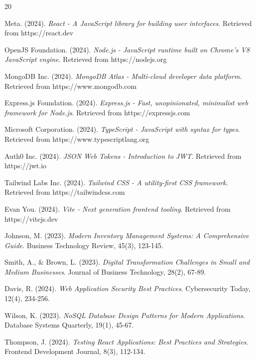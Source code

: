 \renewcommand{\bibname}{REFERENCES}
\begin{thebibliography}{20}

Meta. (2024). \textit{React - A JavaScript library for building user interfaces}. Retrieved from https://react.dev

OpenJS Foundation. (2024). \textit{Node.js - JavaScript runtime built on Chrome's V8 JavaScript engine}. Retrieved from https://nodejs.org

MongoDB Inc. (2024). \textit{MongoDB Atlas - Multi-cloud developer data platform}. Retrieved from https://www.mongodb.com

Express.js Foundation. (2024). \textit{Express.js - Fast, unopinionated, minimalist web framework for Node.js}. Retrieved from https://expressjs.com

Microsoft Corporation. (2024). \textit{TypeScript - JavaScript with syntax for types}. Retrieved from https://www.typescriptlang.org

Auth0 Inc. (2024). \textit{JSON Web Tokens - Introduction to JWT}. Retrieved from https://jwt.io

Tailwind Labs Inc. (2024). \textit{Tailwind CSS - A utility-first CSS framework}. Retrieved from https://tailwindcss.com

Evan You. (2024). \textit{Vite - Next generation frontend tooling}. Retrieved from https://vitejs.dev

Johnson, M. (2023). \textit{Modern Inventory Management Systems: A Comprehensive Guide}. Business Technology Review, 45(3), 123-145.

Smith, A., \& Brown, L. (2023). \textit{Digital Transformation Challenges in Small and Medium Businesses}. Journal of Business Technology, 28(2), 67-89.

Davis, R. (2024). \textit{Web Application Security Best Practices}. Cybersecurity Today, 12(4), 234-256.

Wilson, K. (2023). \textit{NoSQL Database Design Patterns for Modern Applications}. Database Systems Quarterly, 19(1), 45-67.

Thompson, J. (2024). \textit{Testing React Applications: Best Practices and Strategies}. Frontend Development Journal, 8(3), 112-134.


\end{thebibliography}
